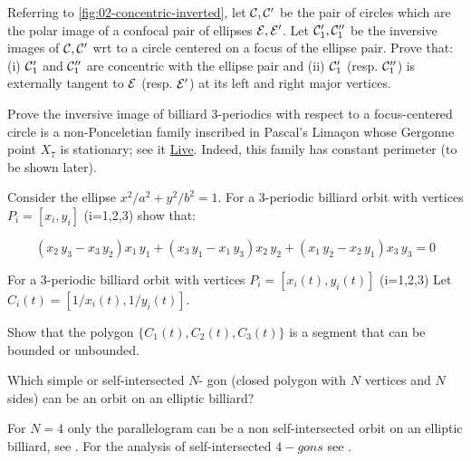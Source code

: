 \begin{exercise}
Referring to \cref{fig:02-concentric-inverted}, let $\mathcal{C},\mathcal{C}'$ be the pair of circles which are the polar image of a confocal pair of ellipses $\mathcal{E},\mathcal{E}'$. Let $\mathcal{C}_1', \mathcal{C}_1''$ be the inversive images of $\mathcal{C},\mathcal{C}'$ wrt to a circle centered on a focus of the ellipse pair. Prove that: (i) $\mathcal{C}_1'$ and $\mathcal{C}_1''$ are concentric with the ellipse pair and (ii) $\mathcal{C}_1'$ (resp. $\mathcal{C}_1''$) is externally tangent to $\mathcal{E}$ (resp. $\mathcal{E}'$) at its left and right major vertices.
\end{exercise}


\begin{exercise}
Prove the inversive image of billiard 3-periodics with respect to a focus-centered circle is a non-Ponceletian family inscribed in Pascal's Limaçon whose Gergonne point $X_7$ is stationary; see it \href{https://bit.ly/3edwKD7}{Live}. Indeed, this family has constant perimeter (to be shown later).
\end{exercise}

\begin{exercise}
 Consider the ellipse $x^2/a^2+y^2/b^2=1$. For a  3-periodic  billiard orbit with vertices $P_i=[x_i,y_i]$ (i=1,2,3)  show that:  

\[ 
 \left( x_2\,y_3-x_3\,y_2 \right) x_1\,
y_1+ \left(x_3\,y_1  - x_1\,y_3\right) x_2\, y_2+ \left( x_1\,y_2-x_2\,y_1 \right) x_3
\,y_3=0
\]

\end{exercise}

\begin{exercise} For a  3-periodic  billiard orbit with vertices $P_i=[x_i(t),y_i(t)]$ (i=1,2,3)
Let $C_i(t)=[1/x_i(t),1/y_i(t)]$. 

Show that the polygon $\{C_1(t),C_2(t),C_3(t)\}$ is a segment that can be bounded or unbounded.
 \label{exe:chap02-inverse-envelope}
\end{exercise}

\begin{exercise} Which simple or self-intersected $N$- gon (closed polygon with $N$ vertices and $N$ sides) can be an orbit on an elliptic billiard? 

 For $N=4$ only the parallelogram can be a non self-intersected orbit on an elliptic billiard, see \cite{connes07}. For the analysis of self-intersected $4-gons$ see \cite{garcia2020-self-intersected}.
\end{exercise}


